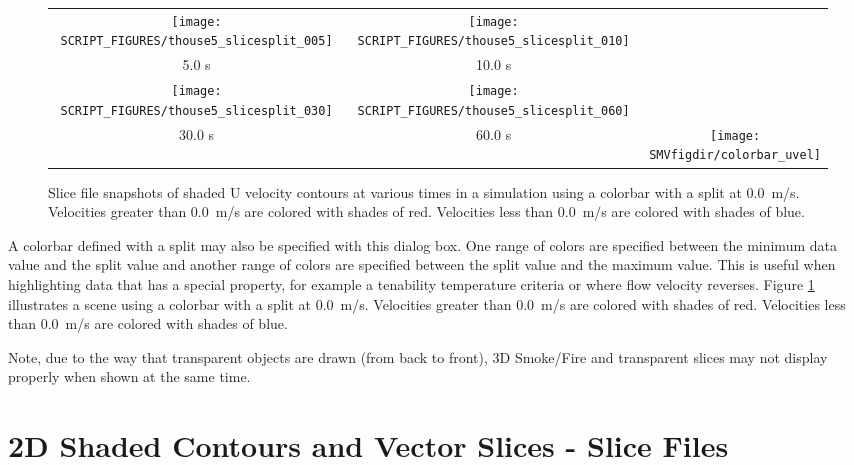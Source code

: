 \documentclass[11pt,twoside]{book}
\newcommand{\figheightAbar}{2.2in}
\begin{document}
\begin{figure}[bph]
\begin{center}
\begin{tabular}{ccc}
\texttt{[image: SCRIPT\_FIGURES/thouse5\_slicesplit\_005]}&
\texttt{[image: SCRIPT\_FIGURES/thouse5\_slicesplit\_010]}\\
5.0 s&10.0 s\\
\texttt{[image: SCRIPT\_FIGURES/thouse5\_slicesplit\_030]}&
\texttt{[image: SCRIPT\_FIGURES/thouse5\_slicesplit\_060]}&\\
30.0 s&60.0 s
&\raisebox{0.0ex}[0pt]{\texttt{[image: \\SMVfigdir/colorbar\_uvel]}}\\
\end{tabular}
\caption [Slice file snapshots of shaded U velocity contours using a colorbar with a split at 0.0~m/s.]
{Slice file snapshots of shaded U velocity contours at various
times in a simulation using a colorbar with a split at 0.0~m/s. Velocities greater than 0.0~m/s are colored with shades of red.
Velocities less than 0.0~m/s are colored with shades of blue. }
\label{figslicesplit}%
\end{center}
\end{figure}


A colorbar defined with a split may also be specified with this dialog box.  One range of colors are specified between the minimum
data value and the split value and another range of colors are specified between the split value and the maximum value. This is useful when highlighting
data that has a special property, for example a tenability temperature criteria or where flow velocity reverses.
Figure \ref{figslicesplit} illustrates a scene using a colorbar with a split at 0.0~m/s. Velocities greater than 0.0~m/s are colored with shades of red.
Velocities less than 0.0~m/s are colored with shades of blue.

Note, due to the way that transparent objects are drawn (from back to front),
3D Smoke/Fire and transparent slices may not display
properly when shown at the same time.

\section{2D Shaded Contours and Vector Slices - Slice Files}
\label{section:slices}
\end{document}
